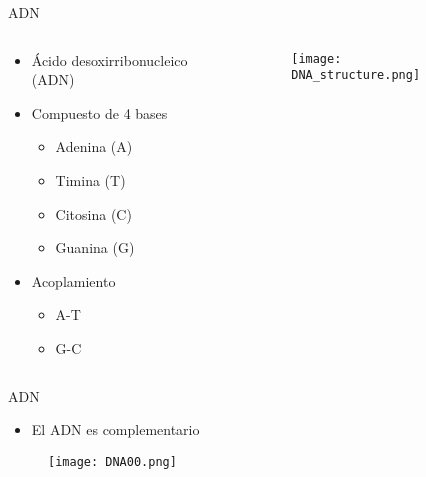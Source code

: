 \documentclass{beamer}
\begin{document}



\begin{frame}{ADN}
\begin{columns}
    \begin{column}{0.47\textwidth}
\begin{itemize}
\item Ácido desoxirribonucleico (ADN)
\item Compuesto de 4 bases
\begin{itemize}
	\item Adenina (A)
	\item Timina (T)
	\item Citosina (C)
	\item Guanina (G)
\end{itemize}
\item Acoplamiento 
\begin{itemize}
	\item A-T
	\item G-C
\end{itemize}
\end{itemize}
    \end{column}
    \begin{column}{0.5\textwidth}
\begin{figure}[H]
\centering
\texttt{[image: DNA\_structure.png]}
\end{figure}
    \end{column}
\end{columns}
\end{frame}

\begin{frame}{ADN}
\begin{itemize}
\item El ADN es complementario
\end{itemize}
\begin{figure}
\centering
\texttt{[image: DNA00.png]}
\end{figure}
\end{frame}
\end{document}

